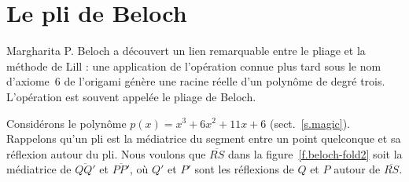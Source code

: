 \section{Le pli de Beloch}\label{s.beloch-fold}

Margharita P. Beloch a découvert un lien remarquable entre le pliage et la méthode de Lill : une application de l'opération connue plus tard sous le nom d'axiome~6 de l'origami génère une racine réelle d'un polynôme de degré trois. L'opération est souvent appelée le 
 pliage de Beloch.

Considérons le polynôme $p(x)=x^3+6x^2+11x+6$ (sect.~\ref{s.magic}). Rappelons qu'un pli est la médiatrice du segment  entre un point quelconque et sa réflexion autour du pli. Nous voulons que $\overline{RS}$ dans la figure~\ref{f.beloch-fold2} soit la médiatrice de $\overline{QQ'}$ et $\overline{PP'}$, où $Q'$ et $P'$ sont les réflexions de $Q$ et $P$ autour de $\overline{RS}$.

